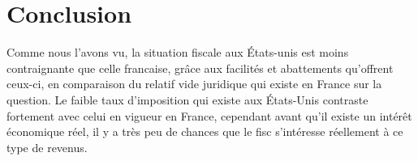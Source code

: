     \section{Conclusion}
        Comme nous l'avons vu, la situation fiscale aux États-unis est moins
        contraignante que celle francaise, grâce aux
        facilités et abattements qu'offrent ceux-ci, en comparaison
        du relatif vide juridique qui existe en France sur la question.
        Le faible taux d'imposition qui existe aux États-Unis contraste
        fortement avec celui en vigueur en France, cependant avant qu'il
        existe un intérêt économique réel, il y a très peu de
        chances que le fisc s'intéresse réellement à ce type de revenus.
